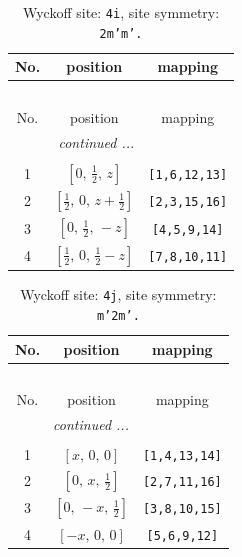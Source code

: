 \documentclass[fleqn,8pt]{jsarticle}
\begin{document}
\renewcommand{\arraystretch}{1.2}
\begin{longtable}{ccc}
\caption{Wyckoff site: {\tt 4i}, site symmetry: {\tt 2m'm'.}}
 \\
 \hline \hline
No. & position & mapping \\ \hline \endfirsthead

\multicolumn{2}{l}{\tablename\ \thetable{}} \\
 \hline \hline
No. & position & mapping \\ \hline \endhead

 \hline \hline
\multicolumn{2}{r}{\footnotesize\it continued ...} \\ \endfoot

 \hline \hline
\multicolumn{2}{r}{} \\ \endlastfoot

1 & $\left[ 0,\, \frac{1}{2},\, z \right]$ & {\tt [1,6,12,13]} \\ \hline
2 & $\left[ \frac{1}{2},\, 0,\, z + \frac{1}{2} \right]$ & {\tt [2,3,15,16]} \\ \hline
3 & $\left[ 0,\, \frac{1}{2},\, - z \right]$ & {\tt [4,5,9,14]} \\ \hline
4 & $\left[ \frac{1}{2},\, 0,\, \frac{1}{2} - z \right]$ & {\tt [7,8,10,11]} \\
\end{longtable}
\renewcommand{\arraystretch}{1.2}
\begin{longtable}{ccc}
\caption{Wyckoff site: {\tt 4j}, site symmetry: {\tt m'2m'.}}
 \\
 \hline \hline
No. & position & mapping \\ \hline \endfirsthead

\multicolumn{2}{l}{\tablename\ \thetable{}} \\
 \hline \hline
No. & position & mapping \\ \hline \endhead

 \hline \hline
\multicolumn{2}{r}{\footnotesize\it continued ...} \\ \endfoot

 \hline \hline
\multicolumn{2}{r}{} \\ \endlastfoot

1 & $\left[ x,\, 0,\, 0 \right]$ & {\tt [1,4,13,14]} \\ \hline
2 & $\left[ 0,\, x,\, \frac{1}{2} \right]$ & {\tt [2,7,11,16]} \\ \hline
3 & $\left[ 0,\, - x,\, \frac{1}{2} \right]$ & {\tt [3,8,10,15]} \\ \hline
4 & $\left[ - x,\, 0,\, 0 \right]$ & {\tt [5,6,9,12]} \\
\end{longtable}
\end{document}
